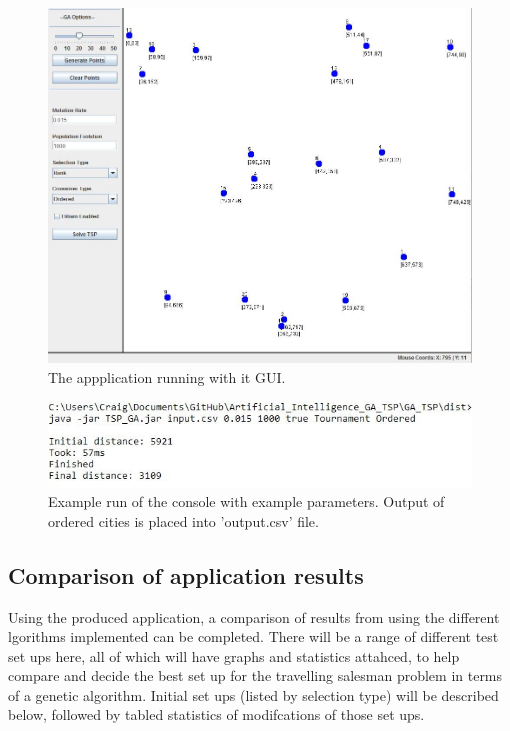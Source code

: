 \documentclass[article]{IEEEtran}
\begin{document}
\begin{figure}[H]
\centering
  \includegraphics[width=.8\linewidth]{images/GUI}
  \caption{The appplication running with it GUI.}
  \label{fig:6}
\end{figure}

\begin{figure}[H]
\centering
  \includegraphics[width=.9\linewidth]{images/commandLine}
  \caption{Example run of the console with example parameters. Output of ordered cities is placed into 'output.csv' file.}
  \label{fig:7}
\end{figure}

\subsection{Comparison of application results}
Using the produced application, a comparison of results from using the different lgorithms implemented can be completed. There will be a range of different test set ups here, all of which will have graphs and statistics attahced, to help compare and decide the best set up for the travelling salesman problem in terms of a genetic algorithm. Initial set ups (listed by selection type) will be described below, followed by tabled statistics of modifcations of those set ups.
\end{document}
